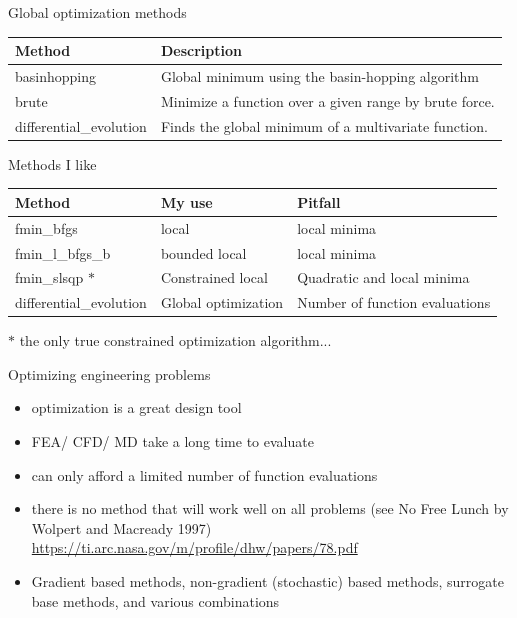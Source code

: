 \documentclass[10pt]{beamer}
\begin{document}
\begin{frame}{Global optimization methods}
\begin{table}
\begin{tabular}{ll}
\textbf{Method} & \textbf{Description}  \\
\hline
basinhopping &	Global minimum using the basin-hopping algorithm\\
brute & 	Minimize a function over a given range by brute force.\\
differential\_evolution & 	Finds the global minimum of a multivariate function.\\
\end{tabular}
\end{table}
\end{frame}

\begin{frame}{Methods I like}
\begin{table}
\begin{tabular}{lll}
\textbf{Method} & \textbf{My use} & \textbf{Pitfall}  \\
\hline
fmin\_bfgs  & local & local minima \\
fmin\_l\_bfgs\_b  & bounded local & local minima \\
fmin\_slsqp $\ast$ & Constrained local & Quadratic and local minima \\
differential\_evolution & 	Global optimization & Number of function evaluations \\
\end{tabular}
\end{table}
$\ast$ the only true constrained optimization algorithm...
\end{frame}

\begin{frame}{Optimizing engineering problems}
\begin{itemize}
\item optimization is a great design tool
\item FEA/ CFD/ MD take a long time to evaluate
\item can only afford a limited number of function evaluations
\item there is no method that will work well on all problems (see No Free Lunch by Wolpert and Macready 1997)  \url{https://ti.arc.nasa.gov/m/profile/dhw/papers/78.pdf}
\item Gradient based methods, non-gradient (stochastic) based methods, surrogate base methods, and various combinations
\end{itemize}
\end{frame}
\end{document}
